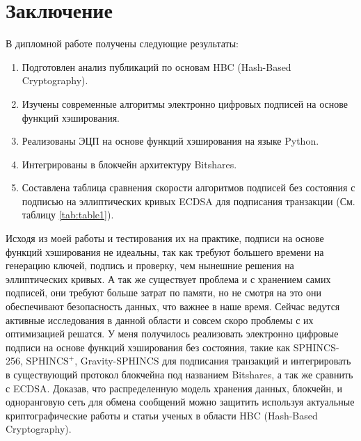 \documentclass[a4paper, 14pt]{extarticle}
\begin{document}
\section{Заключение}
В дипломной работе получены следующие результаты:
\begin{enumerate}
    \item Подготовлен анализ публикаций по основам HBC (Hash-Based Cryptography).
    \item Изучены современные алгоритмы электронно цифровых подписей на основе функций хэширования.
    \item Реализованы ЭЦП на основе функций хэширования на языке Python.
    \item Интегрированы в блокчейн архитектуру Bitshares.
    \item Составлена таблица сравнения скорости алгоритмов подписей без состояния с подписью на эллиптических кривых ECDSA для подписания транзакции (См. таблицу \ref{tab:table1}).
\end{enumerate}

Исходя из моей работы и тестирования их на практике, подписи на основе функций хэширования не идеальны, так как требуют большего времени на генерацию ключей, подпись и проверку, чем нынешние решения на эллиптических кривых. А так же существует проблема и с хранением самих подписей, они требуют больше затрат по памяти, но не смотря на это они обеспечивают безопасность данных, что важнее в наше время. Сейчас ведутся активные исследования в данной области и совсем скоро проблемы с их оптимизацией решатся. У меня получилось реализовать электронно цифровые подписи на основе функций хэширования без состояния, такие как SPHINCS-256, $\text{SPHINCS}^+$, Gravity-SPHINCS для подписания транзакций и интегрировать в существующий протокол блокчейна под названием Bitshares, а так же сравнить с ECDSA. Доказав, что распределенную модель хранения данных, блокчейн, и одноранговую сеть для обмена сообщений можно защитить используя актуальные криптографические работы и статьи ученых в области HBC (Hash-Based Cryptography).
\newpage
\end{document}

